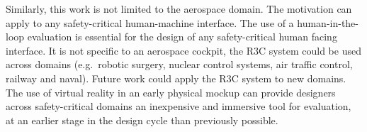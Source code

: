 Similarly, this work is not limited to the aerospace domain.
The motivation can apply to any safety-critical human-machine interface.
The use of a human-in-the-loop evaluation is essential for the design of any safety-critical human facing interface.
It is not specific to an aerospace cockpit, the R3C system could be used across domains (e.g.\ robotic surgery, nuclear control systems, air traffic control, railway and naval).
Future work could apply the R3C system to new domains.
The use of virtual reality in an early physical mockup can provide designers across safety-critical domains an inexpensive and immersive tool for evaluation, at an earlier stage in the design cycle than previously possible.

